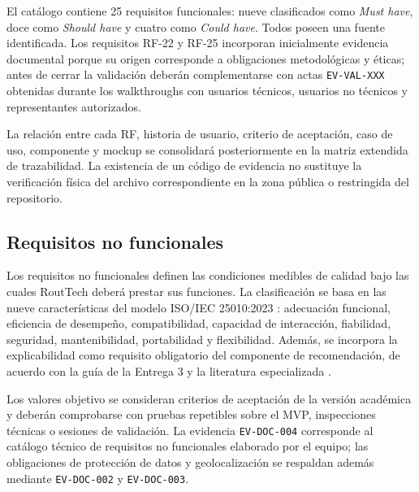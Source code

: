 \documentclass[12pt,a4paper]{article}
\begin{document}
El catálogo contiene 25 requisitos funcionales: nueve clasificados como \emph{Must have}, doce como \emph{Should have} y cuatro como \emph{Could have}. Todos poseen una fuente identificada. Los requisitos RF-22 y RF-25 incorporan inicialmente evidencia documental porque su origen corresponde a obligaciones metodológicas y éticas; antes de cerrar la validación deberán complementarse con actas \texttt{EV-VAL-XXX} obtenidas durante los walkthroughs con usuarios técnicos, usuarios no técnicos y representantes autorizados.

La relación entre cada RF, historia de usuario, criterio de aceptación, caso de uso, componente y mockup se consolidará posteriormente en la matriz extendida de trazabilidad. La existencia de un código de evidencia no sustituye la verificación física del archivo correspondiente en la zona pública o restringida del repositorio.


\subsection{Requisitos no funcionales}

Los requisitos no funcionales definen las condiciones medibles de calidad bajo las cuales RoutTech deberá prestar sus funciones. La clasificación se basa en las nueve características del modelo ISO/IEC 25010:2023 \cite{iso25010}: adecuación funcional, eficiencia de desempeño, compatibilidad, capacidad de interacción, fiabilidad, seguridad, mantenibilidad, portabilidad y flexibilidad. Además, se incorpora la explicabilidad como requisito obligatorio del componente de recomendación, de acuerdo con la guía de la Entrega 3 y la literatura especializada \cite{uteq2026,chazette2020,chazette2021,chazette2022}.

Los valores objetivo se consideran criterios de aceptación de la versión académica y deberán comprobarse con pruebas repetibles sobre el MVP, inspecciones técnicas o sesiones de validación. La evidencia \texttt{EV-DOC-004} corresponde al catálogo técnico de requisitos no funcionales elaborado por el equipo; las obligaciones de protección de datos y geolocalización se respaldan además mediante \texttt{EV-DOC-002} y \texttt{EV-DOC-003}.
\end{document}
